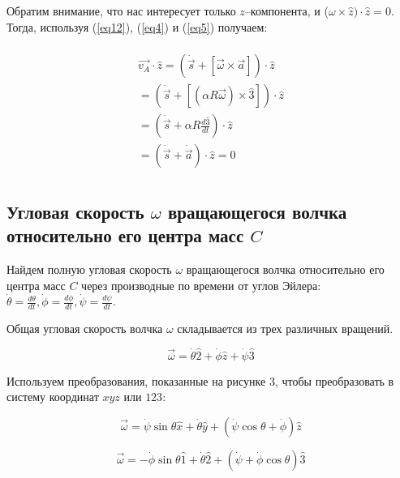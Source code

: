 \documentclass[a4paper,11.5pt]{article} %
\begin{document}
Обратим внимание, что нас интересует только $z$--компонента, и ($\omega \times \hat{z}) \cdot \hat{z} = 0$. Тогда, используя (\ref{eq12}), (\ref{eq4}) и (\ref{eq5}) получаем:

\begin{multline}
	\\
	\overrightarrow{v_A} \cdot \hat{z} = (\dot{\vec{s}} + [\overrightarrow{\omega} \times \vec{a}])\cdot \hat{z}\\
	= (\dot{\vec{s}} + [(\alpha R \overrightarrow{\omega}) \times \hat{3}])\cdot \hat{z}
	\\
	= (\dot{\vec{s}} + \alpha R \frac{d\hat{3}}{dt})\cdot \hat{z}
	\\
	=(\dot{\vec{s}}+ \dot{\vec{a}})\cdot \hat{z} = 0\\
	\label{eq14}
\end{multline}

\subsection{Угловая скорость $\omega$ вращающегося волчка относительно его центра масс $C$}

Найдем полную угловая скорость $\omega$ вращающегося волчка относительно его центра масс $C$ через производные по времени от углов Эйлера: $\dot{\theta} = \frac{d\theta}{dt}, \dot{\phi} = \frac{d\phi}{dt},\dot{\psi} = \frac{d\psi}{dt}.$

Общая угловая скорость волчка $\omega$ складывается из трех различных вращений.

\begin{equation}
	\overrightarrow{\omega} = \dot{\theta}\hat{2} + \dot{\phi}\hat{z} + \dot{\psi} \hat{3}
	\label{eq15}
\end{equation}

Используем преобразования, показанные на рисунке 3, чтобы преобразовать в систему координат $xyz$ или $123$:

\begin{equation}
	\overrightarrow{\omega} = \dot{\psi}\sin\theta \hat{x} + \dot{\theta} \hat{y} + (\dot{\psi}\cos 	\theta + \dot{\phi})\hat{z}
	\label{eq16}
\end{equation}

\begin{equation}
\boxed{
	\overrightarrow{\omega} = -\dot{\phi}\sin \theta\hat{1} + \dot{\theta}\hat{2} + (\dot{\psi}+			\dot{\phi}\cos\theta)\hat{3}
}
	\label{eq17}
\end{equation}
\end{document}
